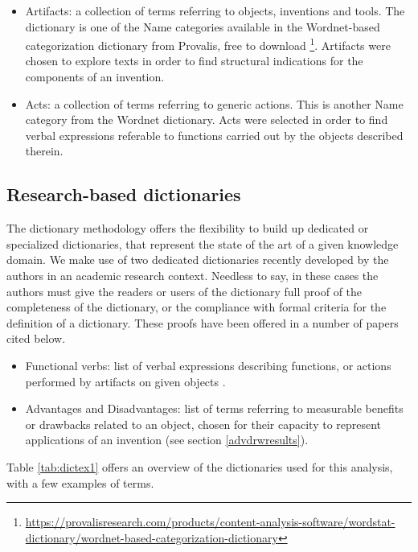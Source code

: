 \documentclass[]{book}
\let\rmarkdownfootnote\footnote%
\def\footnote{\protect\rmarkdownfootnote}
\begin{document}
\begin{itemize}
\item
  Artifacts: a collection of terms referring to objects, inventions and
  tools. The dictionary is one of the Name categories available in the
  Wordnet-based categorization dictionary from Provalis, free to
  download \footnote{\url{https://provalisresearch.com/products/content-analysis-software/wordstat-dictionary/wordnet-based-categorization-dictionary}}.
  Artifacts were chosen to explore texts in order to find structural
  indications for the components of an invention.
\item
  Acts: a collection of terms referring to generic actions. This is
  another Name category from the Wordnet dictionary. Acts were selected
  in order to find verbal expressions referable to functions carried out
  by the objects described therein.
\end{itemize}

\subsection{Research-based
dictionaries}\label{research-based-dictionaries}

The dictionary methodology offers the flexibility to build up dedicated
or specialized dictionaries, that represent the state of the art of a
given knowledge domain. We make use of two dedicated dictionaries
recently developed by the authors in an academic research context.
Needless to say, in these cases the authors must give the readers or
users of the dictionary full proof of the completeness of the
dictionary, or the compliance with formal criteria for the definition of
a dictionary. These proofs have been offered in a number of papers cited
below.

\begin{itemize}
\item
  Functional verbs: list of verbal expressions describing functions, or
  actions performed by artifacts on given objects
  \citep{fantoni2013automatic, apreda2016functional}.
\item
  Advantages and Disadvantages: list of terms referring to measurable
  benefits or drawbacks related to an object, chosen for their capacity
  to represent applications of an invention (see section
  \ref{advdrwresults}).
\end{itemize}

Table \ref{tab:dictex1} offers an overview of the dictionaries used for
this analysis, with a few examples of terms.
\end{document}
